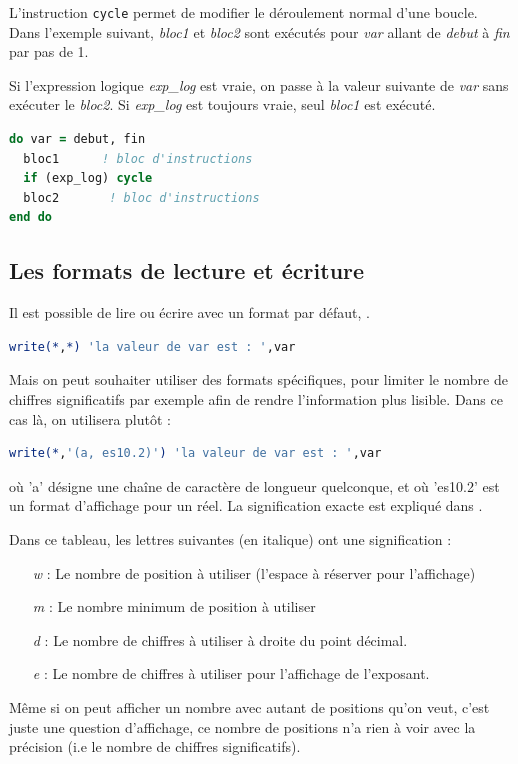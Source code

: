 \documentclass[a4paper,twoside]{article}
\begin{document}
L'instruction \texttt{cycle} permet de modifier le déroulement normal d'une boucle. Dans l'exemple suivant, \emph{bloc1} et \emph{bloc2} sont exécutés pour \emph{var} allant de \emph{debut} à \emph{fin} par pas de 1. 

Si l'expression logique \emph{exp\_log} est vraie, on passe à la valeur suivante de \emph{var} sans exécuter le \emph{bloc2}. Si \emph{exp\_log} est toujours vraie, seul \emph{bloc1} est exécuté.
\begin{lstlisting}[language=Fortran]
do var = debut, fin 
  bloc1      ! bloc d'instructions 
  if (exp_log) cycle
  bloc2       ! bloc d'instructions
end do
\end{lstlisting}

\subsection{Les formats de lecture et écriture}
Il est possible de lire ou écrire avec un format par défaut, \og * \fg. 

\begin{lstlisting}[language=Fortran]
write(*,*) 'la valeur de var est : ',var
\end{lstlisting}

Mais on peut souhaiter utiliser des formats spécifiques, pour limiter le nombre de chiffres significatifs par exemple afin de rendre l'information plus lisible. Dans ce cas là, on utilisera plutôt : 
\begin{lstlisting}[language=Fortran]
write(*,'(a, es10.2)') 'la valeur de var est : ',var
\end{lstlisting}
où 'a' désigne une chaîne de caractère de longueur quelconque, et où 'es10.2' est un format d'affichage pour un réel. La signification exacte est expliqué dans . 

Dans ce tableau, les lettres suivantes (en italique) ont une signification :
\begin{itemize}
\item[\emph{w}]: Le nombre de position à utiliser (l'espace à réserver pour l'affichage)
\item[\emph{m}]: Le nombre minimum de position à utiliser
\item[\emph{d}]: Le nombre de chiffres à utiliser à droite du point décimal.
\item[\emph{e}]: Le nombre de chiffres à utiliser pour l'affichage de l'exposant.
\end{itemize}

Même si on peut afficher un nombre avec autant de positions qu'on veut, c'est juste une question d'affichage, ce nombre de positions n'a rien à voir avec la précision (i.e le nombre de chiffres significatifs). 
\end{document}
